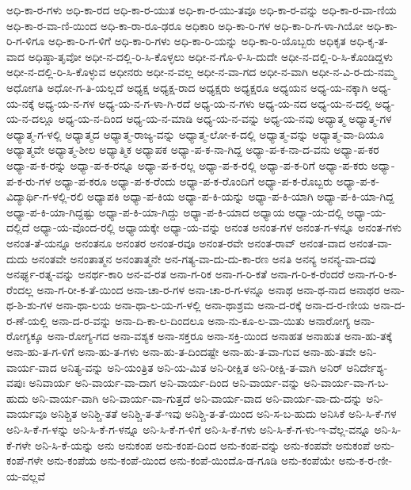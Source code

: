{ಅಧಿ-ಕಾ-ರ-ಗಳು
ಅಧಿ-ಕಾ-ರದ
ಅಧಿ-ಕಾ-ರ-ಯುತ
ಅಧಿ-ಕಾ-ರ-ಯು-ತವೂ
ಅಧಿ-ಕಾ-ರ-ವನ್ನು
ಅಧಿ-ಕಾ-ರ-ವಾ-ಣಿಯ
ಅಧಿ-ಕಾ-ರ-ವಾ-ಣಿ-ಯಿಂದ
ಅಧಿ-ಕಾ-ರಾ-ರೂ-ಢರೂ
ಅಧಿಕಾರಿ
ಅಧಿ-ಕಾ-ರಿ-ಗಳ
ಅಧಿ-ಕಾ-ರಿ-ಗ-ಳಾ-ಗಿಯೋ
ಅಧಿ-ಕಾ-ರಿ-ಗ-ಳಿಗೂ
ಅಧಿ-ಕಾ-ರಿ-ಗ-ಳಿಗೆ
ಅಧಿ-ಕಾ-ರಿ-ಗಳು
ಅಧಿ-ಕಾ-ರಿ-ಯನ್ನು
ಅಧಿ-ಕಾ-ರಿ-ಯೊಬ್ಬರು
ಅಧಿಕೃತ
ಅಧಿ-ಕೃ-ತ-ವಾದ
ಅಧಿಷ್ಠಾ-ತೃವೋ
ಅಧೀ-ನ-ದಲ್ಲಿ-ರಿ-ಸಿ-ಕೊಳ್ಳಲು
ಅಧೀ-ನ-ಗೊ-ಳಿ-ಸಿ-ದುದೇ
ಅಧೀ-ನ-ದಲ್ಲಿ-ರಿ-ಸಿ-ಕೊಂಡಿದ್ದಳು
ಅಧೀ-ನ-ದಲ್ಲಿ-ರಿ-ಸಿ-ಕೊಳ್ಳುವ
ಅಧೀನರು
ಅಧೀ-ನ-ವಲ್ಲ
ಅಧೀ-ನ-ವಾ-ಗದ
ಅಧೀ-ನ-ವಾಗಿ
ಅಧೀ-ನ-ವಿ-ರ-ದು-ನಮ್ಮ
ಅಧೋಗತಿ
ಅಧೋ-ಗ-ತಿ-ಯಲ್ಲದೆ
ಅಧ್ಯಕ್ಷ
ಅಧ್ಯಕ್ಷ-ರಾದ
ಅಧ್ಯಕ್ಷರು
ಅಧ್ಯಕ್ಷರೂ
ಅಧ್ಯಯನ
ಅಧ್ಯ-ಯ-ನಕ್ಕಾಗಿ
ಅಧ್ಯ-ಯ-ನಕ್ಕೆ
ಅಧ್ಯ-ಯ-ನ-ಗಳ
ಅಧ್ಯ-ಯ-ನ-ಗ-ಳಾ-ಗಿ-ರದೆ
ಅಧ್ಯ-ಯ-ನ-ಗಳು
ಅಧ್ಯ-ಯ-ನದ
ಅಧ್ಯ-ಯ-ನ-ದಲ್ಲಿ
ಅಧ್ಯ-ಯ-ನ-ದಲ್ಲೂ
ಅಧ್ಯ-ಯ-ನ-ದಿಂದ
ಅಧ್ಯ-ಯ-ನ-ಮಾಡಿ
ಅಧ್ಯ-ಯ-ನ-ವನ್ನು
ಅಧ್ಯ-ಯ-ನವು
ಅಧ್ಯಾತ್ಮ
ಅಧ್ಯಾತ್ಮ-ಗಳ
ಅಧ್ಯಾತ್ಮ-ಗ-ಳಲ್ಲಿ
ಅಧ್ಯಾತ್ಮದ
ಅಧ್ಯಾತ್ಮ-ರಾಜ್ಯ-ವನ್ನು
ಅಧ್ಯಾತ್ಮ-ಲೋ-ಕ-ದಲ್ಲಿ
ಅಧ್ಯಾತ್ಮ-ವನ್ನು
ಅಧ್ಯಾತ್ಮ-ವಾ-ದಿಯೂ
ಅಧ್ಯಾತ್ಮವೇ
ಅಧ್ಯಾತ್ಮ-ಶೀಲ
ಅಧ್ಯಾತ್ಮಿಕ
ಅಧ್ಯಾಪಕ
ಅಧ್ಯಾ-ಪ-ಕ-ನಾ-ಗಿದ್ದ
ಅಧ್ಯಾ-ಪ-ಕ-ನಾ-ದ-ವನು
ಅಧ್ಯಾ-ಪ-ಕರ
ಅಧ್ಯಾ-ಪ-ಕ-ರನ್ನು
ಅಧ್ಯಾ-ಪ-ಕ-ರನ್ನೂ
ಅಧ್ಯಾ-ಪ-ಕ-ರಲ್ಲ
ಅಧ್ಯಾ-ಪ-ಕ-ರಲ್ಲಿ
ಅಧ್ಯಾ-ಪ-ಕ-ರಿಗೆ
ಅಧ್ಯಾ-ಪ-ಕರು
ಅಧ್ಯಾ-ಪ-ಕ-ರು-ಗಳ
ಅಧ್ಯಾ-ಪ-ಕರೂ
ಅಧ್ಯಾ-ಪ-ಕ-ರೆಂದು
ಅಧ್ಯಾ-ಪ-ಕ-ರೊಂದಿಗೆ
ಅಧ್ಯಾ-ಪ-ಕ-ರೊಬ್ಬರು
ಅಧ್ಯಾ-ಪ-ಕ-ವಿದ್ಯಾರ್ಥಿ-ಗ-ಳಲ್ಲಿ-ರಲಿ
ಅಧ್ಯಾಪಕಿ
ಅಧ್ಯಾ-ಪ-ಕಿಯ
ಅಧ್ಯಾ-ಪ-ಕಿ-ಯನ್ನು
ಅಧ್ಯಾ-ಪ-ಕಿ-ಯಾಗಿ
ಅಧ್ಯಾ-ಪ-ಕಿ-ಯಾ-ಗಿದ್ದ
ಅಧ್ಯಾ-ಪ-ಕಿ-ಯಾ-ಗಿದ್ದಷ್ಟು
ಅಧ್ಯಾ-ಪ-ಕಿ-ಯಾ-ಗಿದ್ದು
ಅಧ್ಯಾ-ಪ-ಕಿ-ಯಾದ
ಅಧ್ಯಾಯ
ಅಧ್ಯಾ-ಯ-ದಲ್ಲಿ
ಅಧ್ಯಾ-ಯ-ದಲ್ಲಿದೆ
ಅಧ್ಯಾ-ಯ-ವೊಂದ-ರಲ್ಲಿ
ಅಧ್ಯಾಯಕ್ಕೇ
ಅಧ್ಯಾ-ಯ-ವನ್ನು
ಅನಂತ
ಅನಂತ-ಗಳ
ಅನಂತ-ಗ-ಳನ್ನೂ
ಅನಂತ-ಗಳು
ಅನಂತ-ತೆ-ಯನ್ನೂ
ಅನಂತನೂ
ಅನಂತರ
ಅನಂತ-ರವೂ
ಅನಂತ-ರವೇ
ಅನಂತ-ರಾವ್
ಅನಂತ-ವಾದ
ಅನಂತ-ವಾ-ದುದು
ಅನಂತವೇ
ಅನಂತಾತ್ಮನ
ಅನಂತಾತ್ಮನೇ
ಅನ-ಗತ್ಯ-ವಾ-ದು-ದು-ಕಾ-ರಣ
ಅನತಿ
ಅನನ್ಯ
ಅನನ್ಯ-ವಾ-ದವು
ಅನರ್ಘ್ಯ-ರತ್ನ-ವನ್ನು
ಅನರ್ಥ-ಕಾರಿ
ಅನ-ವ-ರತ
ಅನಾ-ಗ-ರಿಕ
ಅನಾ-ಗ-ರಿ-ಕತೆ
ಅನಾ-ಗ-ರಿ-ಕ-ರೆಂದರೆ
ಅನಾ-ಗ-ರಿ-ಕ-ರೆಂದಲ್ಲ
ಅನಾ-ಗ-ರೀ-ಕ-ತೆ-ಯಿಂದ
ಅನಾ-ಚಾ-ರ-ಗಳ
ಅನಾ-ಚಾ-ರ-ಗ-ಳನ್ನೂ
ಅನಾಥ
ಅನಾ-ಥ-ನಾದ
ಅನಾಥರ
ಅನಾ-ಥ-ಶಿ-ಶು-ಗಳ
ಅನಾ-ಥಾ-ಲಯ
ಅನಾ-ಥಾ-ಲ-ಯ-ಗ-ಳಲ್ಲಿ
ಅನಾ-ಥಾಶ್ರಮ
ಅನಾ-ದ-ರಕ್ಕೆ
ಅನಾ-ದ-ರ-ಣೀಯ
ಅನಾ-ದ-ರ-ಣೆ-ಯಲ್ಲಿ
ಅನಾ-ದ-ರ-ವನ್ನು
ಅನಾ-ದಿ-ಕಾ-ಲ-ದಿಂದಲೂ
ಅನಾ-ನು-ಕೂ-ಲ-ವಾ-ಯಿತು
ಅನಾರೋಗ್ಯ
ಅನಾ-ರೋಗ್ಯಕ್ಕೂ
ಅನಾ-ರೋಗ್ಯ-ಗದ
ಅನಾ-ವಶ್ಯಕ
ಅನಾ-ಸಕ್ತರೂ
ಅನಾ-ಸಕ್ತಿ-ಯಿಂದ
ಅನಾಹತ
ಅನಾಹುತ
ಅನಾ-ಹು-ತಕ್ಕೆ
ಅನಾ-ಹು-ತ-ಗ-ಳಿಗೆ
ಅನಾ-ಹು-ತ-ಗಳು
ಅನಾ-ಹು-ತ-ದಿಂದಷ್ಟೇ
ಅನಾ-ಹು-ತ-ವಾ-ಗುವ
ಅನಾ-ಹು-ತವೇ
ಅನಿ-ವಾರ್ಯ-ವಾದ
ಅನಿತ್ಯ-ವನ್ನು
ಅನಿ-ಯಂತ್ರಿತ
ಅನಿ-ಯ-ಮಿತ
ಅನಿ-ರೀಕ್ಷಿತ
ಅನಿ-ರೀಕ್ಷಿ-ತ-ವಾಗಿ
ಅನಿರ್
ಅನಿರ್ದೇಶ್ಯ-ವಪುಃ
ಅನಿವಾರ್ಯ
ಅನಿ-ವಾರ್ಯ-ವಾ-ದಾಗ
ಅನಿ-ವಾರ್ಯ-ದಿಂದ
ಅನಿ-ವಾರ್ಯ-ವನ್ನು
ಅನಿ-ವಾರ್ಯ-ವಾ-ಗ-ಬ-ಹುದು
ಅನಿ-ವಾರ್ಯ-ವಾಗಿ
ಅನಿ-ವಾರ್ಯ-ವಾ-ಗುತ್ತದೆ
ಅನಿ-ವಾರ್ಯ-ವಾದ
ಅನಿ-ವಾರ್ಯ-ವಾ-ದು-ದನ್ನು
ಅನಿ-ವಾರ್ಯವೂ
ಅನಿಶ್ಚಿತ
ಅನಿಶ್ಚಿ-ತತೆ
ಅನಿಶ್ಚಿ-ತ-ತೆ-ಇವು
ಅನಿಶ್ಚಿ-ತ-ತೆ-ಯಿಂದ
ಅನಿ-ಸ-ಬ-ಹುದು
ಅನಿಸಿಕೆ
ಅನಿ-ಸಿ-ಕೆ-ಗಳ
ಅನಿ-ಸಿ-ಕೆ-ಗ-ಳನ್ನು
ಅನಿ-ಸಿ-ಕೆ-ಗ-ಳನ್ನೂ
ಅನಿ-ಸಿ-ಕೆ-ಗ-ಳಿಗೆ
ಅನಿ-ಸಿ-ಕೆ-ಗಳು
ಅನಿ-ಸಿ-ಕೆ-ಗ-ಳು-ಇ-ವೆಲ್ಲ-ವನ್ನೂ
ಅನಿ-ಸಿ-ಕೆ-ಗಳೇ
ಅನಿ-ಸಿ-ಕೆ-ಯನ್ನು
ಅನು
ಅನುಕಂಪ
ಅನು-ಕಂಪ-ದಿಂದ
ಅನು-ಕಂಪ-ವನ್ನು
ಅನು-ಕಂಪವೇ
ಅನುಕಂಪೆ
ಅನು-ಕಂಪೆ-ಗಳೇ
ಅನು-ಕಂಪೆಯ
ಅನು-ಕಂಪೆ-ಯಿಂದ
ಅನು-ಕಂಪೆ-ಯಿಂದೊ-ಡ-ಗೂಡಿ
ಅನು-ಕಂಪೆಯೇ
ಅನು-ಕ-ರ-ಣೀ-ಯ-ವಲ್ಲವೆ
}
